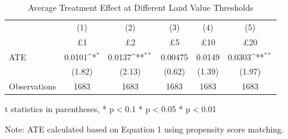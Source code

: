 {
\def\sym#1{\ifmmode^{#1}\else\(^{#1}\)\fi}
\begin{table}
\centering
\begin{threeparttable}
\caption{Average Treatment Effect at Different Land Value Thresholds}
\begin{tabular}{l*{5}{c}}
\hline
                    &\multicolumn{1}{c}{(1)}&\multicolumn{1}{c}{(2)}&\multicolumn{1}{c}{(3)}&\multicolumn{1}{c}{(4)}&\multicolumn{1}{c}{(5)}\\
                    &\multicolumn{1}{c}{\pounds1}&\multicolumn{1}{c}{\pounds2}&\multicolumn{1}{c}{\pounds5}&\multicolumn{1}{c}{\pounds10}&\multicolumn{1}{c}{\pounds20}\\
\hline

ATE &      0.0101\sym{*}  &      0.0137\sym{**} &     0.00475         &      0.0149         &      0.0303\sym{**} \\
                    &      (1.82)         &      (2.13)         &      (0.62)         &      (1.39)         &      (1.97)         \\
\hline
Observations        &        1683         &        1683         &        1683         &        1683         &        1683         \\
\hline

\end{tabular}
\begin{tablenotes}
    \item t statistics in parentheses, * p$<$0.1 * p$<$0.05 * p$<$0.01
    \footnotesize
    \item Note: ATE calculated based on Equation 1 using propensity score matching.
\end{tablenotes}
\end{threeparttable}
\end{table}
}
